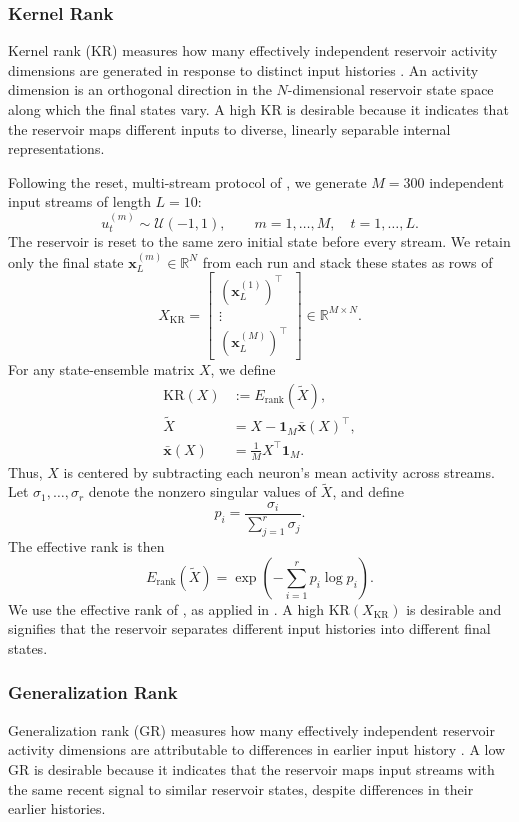 \documentclass[a4paper,fleqn]{style_neural_networks/cas-dc}
\let\parencite\citep
\begin{document}
\subsubsection{Kernel Rank}
Kernel rank (KR) measures how many effectively independent reservoir activity dimensions are generated in response to distinct input histories \parencite{maass_comp_power_2004,legenstein_maass_2007,busing_connectivity_2010}. An activity dimension is an orthogonal direction in the \(N\)-dimensional reservoir state space along which the final states vary. A high KR is desirable because it indicates that the reservoir maps different inputs to diverse, linearly separable internal representations.

Following the reset, multi-stream protocol of \citet{vidamour_quantifying_2022}, we generate \(M=300\) independent input streams of length \(L=10\):
\[
u_t^{(m)}\sim\mathcal{U}(-1,1),
\qquad
m=1,\ldots,M,
\quad
t=1,\ldots,L.
\]
The reservoir is reset to the same zero initial state before every stream. We retain only the final state \(\mathbf{x}_L^{(m)}\in\mathbb{R}^{N}\) from each run and stack these states as rows of
\[
X_{\mathrm{KR}}
=
\begin{bmatrix}
(\mathbf{x}_L^{(1)})^\top\\
\vdots\\
(\mathbf{x}_L^{(M)})^\top
\end{bmatrix}
\in\mathbb{R}^{M\times N}.
\]
For any state-ensemble matrix \(X\), we define
\[
\begin{aligned}
\mathrm{KR}(X)
&:= E_{\mathrm{rank}}(\widetilde{X}), \\
\widetilde{X}
&= X-\mathbf{1}_M\bar{\mathbf{x}}(X)^\top, \\
\bar{\mathbf{x}}(X)
&= \frac{1}{M}X^\top\mathbf{1}_M.
\end{aligned}
\]
Thus, \(X\) is centered by subtracting each neuron's mean activity across streams. Let \(\sigma_1,\ldots,\sigma_r\) denote the nonzero singular values of \(\widetilde{X}\), and define
\[
p_i=\frac{\sigma_i}{\sum_{j=1}^{r}\sigma_j}.
\]
The effective rank is then
\[
E_{\mathrm{rank}}(\widetilde{X})
=
\exp\left(
-\sum_{i=1}^{r} p_i\log p_i
\right).
\]
We use the effective rank of \citet{roy_effective_rank_2007}, as applied in \parencite{love_task_agnostic_2021,Stepney2024PRCtutorial}. A high \(\mathrm{KR}(X_{\mathrm{KR}})\) is desirable and signifies that the reservoir separates different input histories into different final states.

\subsubsection{Generalization Rank}
Generalization rank (GR) measures how many effectively independent reservoir activity dimensions are attributable to differences in earlier input history \parencite{legenstein_maass_2007,busing_connectivity_2010}. A low GR is desirable because it indicates that the reservoir maps input streams with the same recent signal to similar reservoir states, despite differences in their earlier histories.
\end{document}
